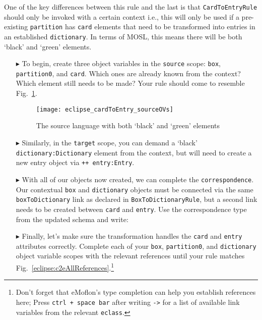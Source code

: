 One of the key differences between this rule and the last is that \texttt{Card\-To\-Ent\-ry\-Rule} should only be invoked with a certain context i.e., this will
only be used if a pre-existing \texttt{partition} has \texttt{card} elements that need to be transformed into entries in an established \texttt{dictionary}. In
terms of MOSL, this means there will be both `black' and `green' elements.

\begin{itemize}

\item[$\blacktriangleright$] To begin, create three object variables in the \texttt{source} scope: \texttt{box}, \texttt{partition0}, and \texttt{card}. Which
ones are already known from the context? Which element still needs to be made? Your rule should come to resemble Fig.~\ref{eclipse:c2eRuleSource}.

\begin{figure}[htbp]
\begin{center}
  \texttt{[image: eclipse\_cardToEntry\_sourceOVs]}
  \caption{The source language with both `black' and `green' elements}
  \label{eclipse:c2eRuleSource}
\end{center}
\end{figure}

\item[$\blacktriangleright$] Similarly, in the \texttt{target} scope, you can demand a `black' \texttt{dic\-tion\-ary:Dic\-tion\-ary} element from the context,
but will need to create a new entry object via \texttt{++ entry:Entry}. 

\vspace{0.5cm}

\item[$\blacktriangleright$] With all of our objects now created, we can complete the \texttt{cor\-res\-pon\-dence}. Our contextual \texttt{box} and
\texttt{dictionary} objects must be connected via the same \texttt{boxToDictionary} link as declared in \texttt{Box\-To\-Dict\-ion\-ary\-Rule}, but a second
link needs to be created between \texttt{card} and \texttt{entry}. Use the correspondence type from the updated schema and write: 

\vspace{0.5cm}

\item[$\blacktriangleright$] Finally, let's make sure the transformation handles the \texttt{card} and \texttt{entry} attributes correctly. Complete each of
your \texttt{box}, \texttt{partition0}, and \texttt{dictionary} object variable scopes with the relevant references until your rule matches
Fig.~\ref{eclipse:c2eAllReferences}.\footnote{Don't forget that eMoflon's type completion can help you establish references here; Press \texttt{ctrl + space
bar} after writing \texttt{->} for a list of available link variables from the relevant \texttt{eclass}.}


\end{itemize}
